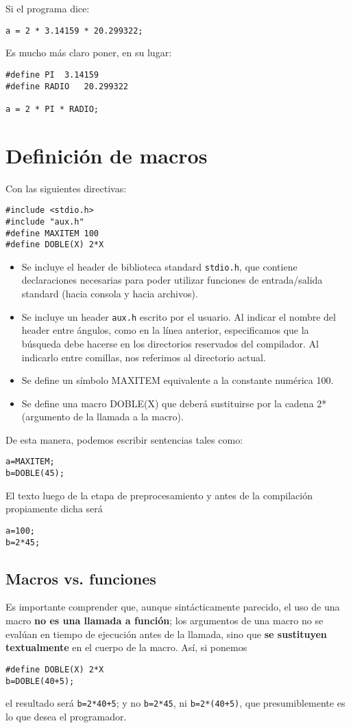Si el programa dice:
\begin{lstlisting}
a = 2 * 3.14159 * 20.299322;
\end{lstlisting}
Es mucho más claro poner, en su lugar:
\begin{lstlisting}
#define PI	3.14159
#define RADIO	20.299322

a = 2 * PI * RADIO;
\end{lstlisting}



\section{Definición de macros}
Con las siguientes directivas:
\begin{lstlisting}
#include <stdio.h>
#include "aux.h"
#define MAXITEM 100
#define DOBLE(X) 2*X
\end{lstlisting}

\begin{itemize}
	\item Se incluye el header de biblioteca standard \lstinline{stdio.h}, que contiene declaraciones necesarias para
poder utilizar funciones de entrada/salida standard (hacia consola y hacia archivos).
\item Se incluye un header \lstinline{aux.h} escrito por el usuario. Al indicar el nombre del header entre ángulos, como en la línea anterior, especificamos que la búsqueda debe hacerse en los directorios reservados del compilador. Al indicarlo entre comillas, nos referimos al directorio actual.
\item Se define un símbolo MAXITEM equivalente a la constante numérica 100.
\item Se define una macro DOBLE(X) que deberá sustituirse por la cadena 2*(argumento de la llamada
a la macro).
\end{itemize}

De esta manera, podemos escribir sentencias tales como:
\begin{lstlisting}
a=MAXITEM;
b=DOBLE(45);
\end{lstlisting}
El texto luego de la etapa de preprocesamiento y antes de la compilación propiamente dicha será
\begin{lstlisting}
a=100;
b=2*45;
\end{lstlisting}

\subsection{Macros vs. funciones}
Es importante comprender que, aunque sintácticamente parecido, el uso de una macro \textbf{no es una
llamada a función}; los argumentos de una macro no se evalúan en tiempo de ejecución antes de la
llamada, sino que \textbf{se sustituyen textualmente} en el cuerpo de la macro. Así, si ponemos
\begin{lstlisting}
#define DOBLE(X) 2*X
b=DOBLE(40+5);
\end{lstlisting}
el resultado será \lstinline{b=2*40+5}; y no \lstinline{b=2*45}, ni \lstinline{b=2*(40+5)}, que presumiblemente es lo que desea el
programador.

